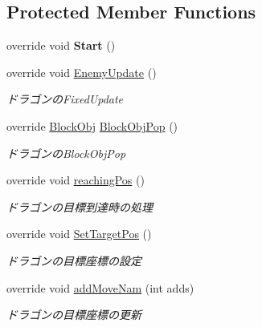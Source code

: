 \subsection*{Protected Member Functions}
\begin{DoxyCompactItemize}
\item 
\mbox{\label{class_doragon_acd4044a679832e13cbcd81973f40ad9d}} 
override void {\bfseries Start} ()
\item 
override void \hyperlink{class_doragon_abf6c6c47805aa970c8dac34b61f38719}{Enemy\+Update} ()
\begin{DoxyCompactList}\small\item\em ドラゴンの\+Fixed\+Update \end{DoxyCompactList}\item 
override \hyperlink{class_block_obj}{Block\+Obj} \hyperlink{class_doragon_a981089224fd04b5d556eae0b9801112f}{Block\+Obj\+Pop} ()
\begin{DoxyCompactList}\small\item\em ドラゴンの\+Block\+Obj\+Pop \end{DoxyCompactList}\item 
override void \hyperlink{class_doragon_a1fcb48ea850873c4b6d19cc3d215d2f5}{reaching\+Pos} ()
\begin{DoxyCompactList}\small\item\em ドラゴンの目標到達時の処理 \end{DoxyCompactList}\item 
override void \hyperlink{class_doragon_ada19292614ee1a706b373875fab11a01}{Set\+Target\+Pos} ()
\begin{DoxyCompactList}\small\item\em ドラゴンの目標座標の設定 \end{DoxyCompactList}\item 
override void \hyperlink{class_doragon_a598414769bbb8243a523b937eba7225e}{add\+Move\+Nam} (int adds)
\begin{DoxyCompactList}\small\item\em ドラゴンの目標座標の更新 \end{DoxyCompactList}\end{DoxyCompactItemize}
